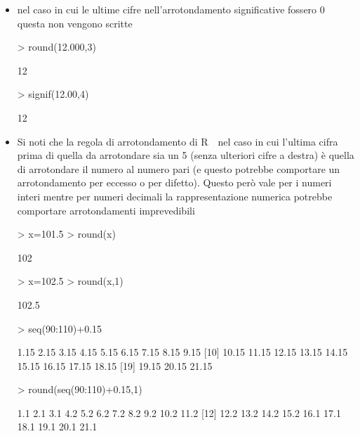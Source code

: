 \documentclass[onecolumn,11pt]{book}
\newcommand{\rpr}{\textsf{R}~}
\begin{document}
\begin{itemize}
\item nel caso in cui le ultime cifre nell'arrotondamento  significative fossero 0 questa non vengono scritte 
\begin{Schunk}
\begin{Sinput}
> round(12.000,3)
\end{Sinput}
\begin{Soutput}
[1] 12
\end{Soutput}
\begin{Sinput}
> signif(12.00,4)
\end{Sinput}
\begin{Soutput}
[1] 12
\end{Soutput}
\end{Schunk}
\item
Si noti che la regola di arrotondamento di \rpr\ nel caso in cui l'ultima cifra prima di quella da arrotondare sia un 5 (senza ulteriori cifre a destra) \`e quella di arrotondare il numero al numero pari  (e questo potrebbe comportare un arrotondamento per eccesso o per difetto). Questo per\`o vale per i numeri interi mentre per numeri decimali la rappresentazione numerica potrebbe comportare arrotondamenti imprevedibili
\begin{Schunk}
\begin{Sinput}
> x=101.5
> round(x)
\end{Sinput}
\begin{Soutput}
[1] 102
\end{Soutput}
\begin{Sinput}
> x=102.5
> round(x,1)
\end{Sinput}
\begin{Soutput}
[1] 102.5
\end{Soutput}
\begin{Sinput}
> seq(90:110)+0.15
\end{Sinput}
\begin{Soutput}
 [1]  1.15  2.15  3.15  4.15  5.15  6.15  7.15  8.15  9.15
[10] 10.15 11.15 12.15 13.15 14.15 15.15 16.15 17.15 18.15
[19] 19.15 20.15 21.15
\end{Soutput}
\begin{Sinput}
> round(seq(90:110)+0.15,1)
\end{Sinput}
\begin{Soutput}
 [1]  1.1  2.1  3.1  4.2  5.2  6.2  7.2  8.2  9.2 10.2 11.2
[12] 12.2 13.2 14.2 15.2 16.1 17.1 18.1 19.1 20.1 21.1
\end{Soutput}
\end{Schunk}

\end{itemize}
\end{document}
